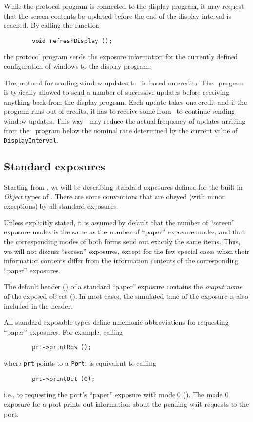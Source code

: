 While the protocol program is connected to the display program, it
may request that the screen contents be updated before the
end of the display interval is reached.
By calling the function
\begin{verbatim}
        void refreshDisplay ();
\end{verbatim}
the protocol program sends the exposure information for the currently defined
configuration of windows to the display program.

The protocol for sending window updates to \dsd\ is based on credits.
The \smurph\ program is typically allowed to send a number of successive
updates before receiving anything back from the display program.
Each update takes one credit and if the program runs out of credits, it has
to receive some from \dsd\ to continue sending window updates.
This way \dsd\ may reduce the actual frequency of updates arriving from the
\smurph\ program below the nominal rate determined by the current
value of {\tt DisplayInterval}.

\subsection{Standard exposures}
\label{rm_ex_se}

Starting from , we will be describing
standard exposures defined for the built-in
{\em Object\/} types of \smurph.
There are some conventions that are obeyed (with minor exceptions)
by all standard exposures.

Unless explicitly stated, it is assumed by default that the number of
``screen'' exposure modes is the same as the number of ``paper''
exposure modes, and that the corresponding modes of both forms send
out exactly the same items.
Thus, we will not discuss ``screen'' exposures, except for the few special
cases when their information contents differ from the information
contents of the corresponding ``paper'' exposures.

The default header ()
of a standard ``paper'' exposure contains the {\em output name\/} of the
exposed object ().
In most cases, the simulated time of the exposure is also included in the
header.

All standard exposable types define mnemonic abbreviations for requesting
``paper'' exposures.
For example, calling
\begin{verbatim}
        prt->printRqs ();
\end{verbatim}
where {\tt prt} points to a {\tt Port}, is equivalent to calling
\begin{verbatim}
        prt->printOut (0);
\end{verbatim}
i.e., to requesting the port's ``paper'' exposure with mode 0
().
The mode 0 exposure for a port prints out information about the
pending wait requests to the port.

